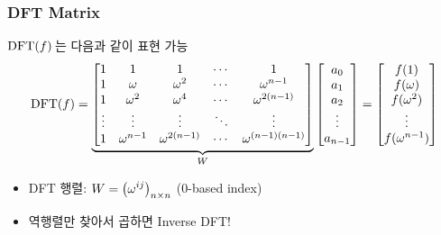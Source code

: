 \begin{frame}
    \frametitle{DFT Matrix}
    \(\mathrm{DFT}(f)\)\,는 다음과 같이 표현 가능
    \[
        \mathrm{DFT}(f) = \underbrace{\begin{bmatrix}
                1      & 1              & 1                 & \cdots & 1                       \\
                1      & \omega         & \omega^2          & \cdots & \omega^{n - 1}          \\
                1      & \omega^2       & \omega^4          & \cdots & \omega^{2(n - 1)}       \\
                \vdots & \vdots         & \vdots            & \ddots & \vdots                  \\
                1      & \omega^{n - 1} & \omega^{2(n - 1)} & \cdots & \omega^{(n - 1)(n - 1)}
            \end{bmatrix}}_{W}
        \begin{bmatrix}
            a_0 \\ a_1 \\ a_2 \\ \vdots \\ a_{n - 1}
        \end{bmatrix} =
        \begin{bmatrix}
            f(1) \\ f(\omega) \\ f(\omega^2) \\ \vdots \\ f(\omega^{n - 1})
        \end{bmatrix}
    \]

    \pause

    \begin{itemize}
        \item<2-> \alert{DFT 행렬}: \(\displaystyle W = \left(\omega^{ij}\right)_{n \times n}\) (0-based index)
        \item<3-> 역행렬만 찾아서 곱하면 Inverse DFT!
    \end{itemize}
\end{frame}

